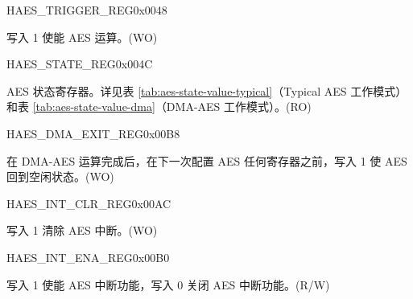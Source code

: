 \begin{register}{H}{AES\_TRIGGER\_REG}{0x0048}\label{regdesc:AESTRIGGERREG}
%
%
\regnewline%
\begin{regdesc}\begin{reglist}
\item [AES\_TRIGGER] 写入 1 使能 AES 运算。(WO)
\end{reglist}\end{regdesc}
\end{register}


\begin{register}{H}{AES\_STATE\_REG}{0x004C}\label{regdesc:AESSTATEREG}
%
%
\regnewline%
\begin{regdesc}\begin{reglist}
\item [AES\_STATE] AES 状态寄存器。详见表 \ref{tab:aes-state-value-typical}（Typical AES 工作模式）和表 \ref{tab:aes-state-value-dma}（DMA-AES 工作模式）。(RO) 
\end{reglist}\end{regdesc}
\end{register}

\begin{register}{H}{AES\_DMA\_EXIT\_REG}{0x00B8}\label{regdesc:AESDMAEXITREG}
%
%
\regnewline%
\begin{regdesc}\begin{reglist}
\item [AES\_DMA\_EXIT] 在 DMA-AES 运算完成后，在下一次配置 AES 任何寄存器之前，写入 1 使 AES 回到空闲状态。(WO)
\end{reglist}\end{regdesc}
\end{register}


\begin{register}{H}{AES\_INT\_CLR\_REG}{0x00AC}\label{regdesc:AESINTCLRREG}
%
%
\regnewline%
\begin{regdesc}\begin{reglist}
\item [AES\_INT\_CLR] 写入 1 清除 AES 中断。(WO)
\end{reglist}\end{regdesc}
\end{register}


\begin{register}{H}{AES\_INT\_ENA\_REG}{0x00B0}\label{regdesc:AESINTENAREG}
%
%
\regnewline%
\begin{regdesc}\begin{reglist}
\item [AES\_INT\_ENA] 写入 1 使能 AES 中断功能，写入 0 关闭 AES 中断功能。(R/W)
\end{reglist}\end{regdesc}
\end{register}
